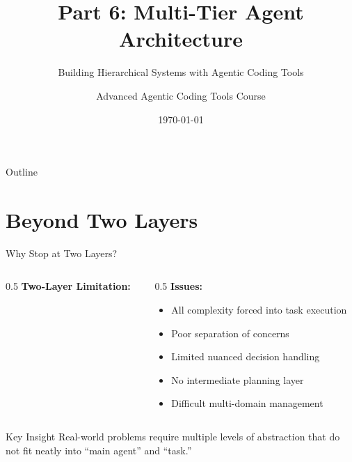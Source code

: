 \documentclass[aspectratio=169,11pt]{beamer}
\title[Part 6: Multi-Tier Architecture]{Part 6: Multi-Tier Agent Architecture}
\subtitle{Building Hierarchical Systems with Agentic Coding Tools}
\author{Advanced Agentic Coding Tools Course}
\institute{University of South Carolina}
\date{\today}
\begin{document}
\begin{frame}[plain]
    \titlepage
\end{frame}

\begin{frame}{Outline}
    \tableofcontents
\end{frame}

\section{Beyond Two Layers}

\begin{frame}{Why Stop at Two Layers?}
    \begin{columns}[T]
        \begin{column}{0.5\textwidth}
            \textbf{Two-Layer Limitation:}
            \begin{center}
            \end{center}
        \end{column}
        \begin{column}{0.5\textwidth}
            \textbf{Issues:}
            \begin{itemize}
                \item All complexity forced into task execution
                \item Poor separation of concerns
                \item Limited nuanced decision handling
                \item No intermediate planning layer
                \item Difficult multi-domain management
            \end{itemize}
        \end{column}
    \end{columns}

    \vspace{0.5cm}
    \begin{block}{Key Insight}
        Real-world problems require multiple levels of abstraction that do not fit neatly into ``main agent'' and ``task.''
    \end{block}

\end{frame}
\end{document}
